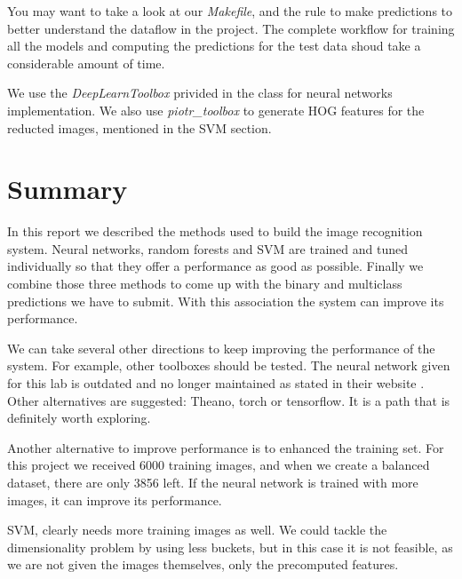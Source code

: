 \documentclass{article} %
\begin{document}
You may want to take a look at our \emph{Makefile}, and the rule to make predictions to better understand the dataflow in the project. The complete workflow for training all the models and computing the predictions for the test data shoud take a considerable amount of time.

We use the \emph{DeepLearnToolbox} privided in the class for neural networks implementation. We also use \emph{piotr\_toolbox} to generate HOG features for the reducted images, mentioned in the SVM section.

\section{Summary}

In this report we described the methods used to build the image recognition system. 
Neural networks, random forests and SVM are trained and tuned individually so that they offer a performance as good as possible.
Finally we combine those three methods to come up with the binary and multiclass predictions we have to submit. 
With this association the system can improve its performance.

We can take several other directions to keep improving the performance of the system.
For example, other toolboxes should be tested. The neural network given for this lab is outdated and no longer maintained as stated in their website \cite{deeplearningtoolbox}. Other alternatives are suggested: Theano, torch or tensorflow. It is a path that is definitely worth exploring.

Another alternative to improve performance is to enhanced the training set. 
For this project we received 6000 training images, and when we create a balanced dataset, there are only 3856 left.
If the neural network is trained with more images, it can improve its performance.

SVM, clearly needs more training images as well. We could tackle the dimensionality problem by using less buckets, but in this case it is not feasible, as we are not given the images themselves, only the precomputed features.



\end{document}
